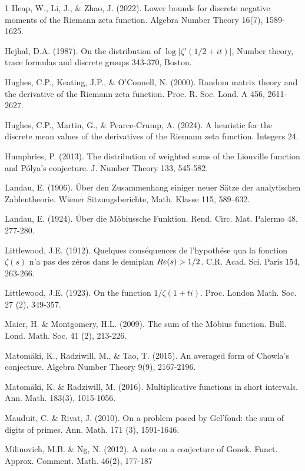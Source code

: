 \documentclass[11pt,article]{amsart}
\numberwithin{equation}{section}
\numberwithin{equation}{section}
\numberwithin{lemma}{section}
\numberwithin{prop}{section}
\begin{document}
\begin{thebibliography}{1}
Heap, W., Li, J., \& Zhao, J. (2022). Lower bounds for discrete negative moments of the Riemann zeta function. Algebra Number Theory 16(7), 1589-1625. 

Hejhal, D.A. (1987). On the distribution of $\log\left|\zeta'(1/2+it)\right|$, Number theory, trace formulas and discrete groups 343-370, Boston.

Hughes, C.P., Keating, J.P., \& O'Connell, N. (2000). Random matrix theory and the derivative of the Riemann zeta function. Proc. R. Soc. Lond. A 456, 2611-2627.

Hughes, C.P., Martin, G., \& Pearce-Crump, A. (2024). A heuristic for the discrete mean values of the derivatives of the Riemann zeta function. Integers 24. 

Humphries, P. (2013). The distribution of weighted sums of the Liouville function and P{\'o}lya's conjecture. J. Number Theory 133, 545-582. 

Landau, E. (1906). {\"U}ber den Zusammenhang einiger neuer S{\"a}tze der analytischen Zahlentheorie. Wiener Sitzungsberichte, Math. Klasse 115, 589–632.

Landau, E. (1924). {\"U}ber die M{\"o}biussche Funktion. Rend. Circ. Mat. Palermo 48, 277-280.

Littlewood, J.E. (1912). Quelques cons{\'e}quences de l'hypoth{\'e}se qua la fonction $\zeta(s)$ n'a pas des z{\'e}ros dans le demiplan $\textnormal{Re}(s)>1/2$. C.R. Acad. Sci. Paris 154, 263-266.

Littlewood, J.E. (1923). On the function $1/\zeta(1+ti)$. Proc. London Math. Soc. 27 (2), 349-357.

Maier, H. \& Montgomery, H.L. (2009). The sum of the M{\"o}bius function. Bull. Lond. Math. Soc. 41 (2), 213-226.

Matom{\"a}ki, K., Radziwill, M., \& Tao, T. (2015). An averaged form of Chowla's conjecture. Algebra Number Theory 9(9), 2167-2196. 

Matom{\"a}ki, K. \& Radziwill, M. (2016). Multiplicative functions in short intervals. Ann. Math. 183(3), 1015-1056. 

Mauduit, C. \& Rivat, J. (2010). On a problem posed by Gel'fond: the sum of digits of primes. Ann. Math. 171 (3), 1591-1646. 

Milinovich, M.B. \& Ng, N. (2012). A note on a conjecture of Gonek. Funct. Approx. Comment. Math. 46(2), 177-187


\end{thebibliography}
\end{document}
